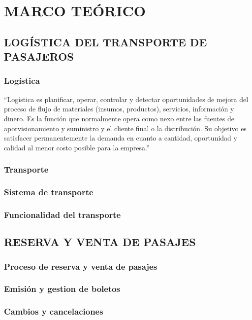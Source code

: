 \chapter{MARCO TEÓRICO} 
	
	\vspace{0pt}
	
	\section{LOGÍSTICA DEL TRANSPORTE DE PASAJEROS}
	\subsection{Logística}
		``Logística es planificar, operar, controlar y detectar oportunidades de mejora del proceso de flujo de materiales (insumos, productos), servicios, información y dinero.  Es la función que normalmente opera como nexo entre las fuentes de aporvisionamiento y suministro y el cliente final o la distribución.  Su objetivo es satisfacer permanentemente la demanda en cuanto a cantidad, oportunidad y calidad al menor costo posible para la empresa.''\parencite{carro2013logistica}
	\subsection{Transporte}
	
	\subsection{Sistema de transporte}
	\subsection{Funcionalidad del transporte}
	\section{RESERVA Y VENTA DE PASAJES}
	\subsection{Proceso de reserva y venta de pasajes}
	\subsection{Emisión y gestion de boletos}
	\subsection{Cambios y cancelaciones}
